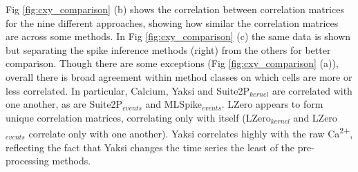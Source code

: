 \documentclass[a4paper,10pt,twocolumn]{article}
\begin{document}
Fig \ref{fig:cxy_comparison} (b) shows the correlation between correlation matrices for the nine different approaches, showing how similar the correlation matrices are across some methods. In Fig \ref{fig:cxy_comparison} (c) the same data is shown but separating the spike inference methods (right) from the others for better comparison. Though there are some exceptions (Fig \ref{fig:cxy_comparison} (a)), overall there is broad agreement within method classes on which cells are more or less correlated. In particular, Calcium, Yaksi and Suite2P$_{kernel}$ are correlated with one another, as are Suite2P$_{events}$ and MLSpike$_{events}$. LZero appears to form unique correlation matrices, correlating only with itself (LZero$_{kernel}$ and LZero$_{events}$ correlate only with one another). Yaksi correlates highly with the raw Ca\textsuperscript{2+}, reflecting the fact that Yaksi changes the time series the least of the pre-processing methods. 
\end{document}
